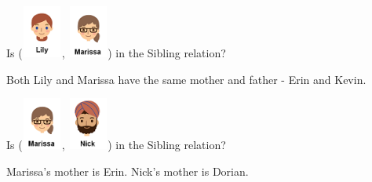 \documentclass{ximera}
\begin{document}
\begin{exercise}
Is ({\includegraphics[width=50px,height=65px]{pics/people/lily.png}}, {\includegraphics[width=50px,height=65px]{pics/people/marissa.png}}) in the Sibling relation?

  \begin{multipleChoice}
  \end{multipleChoice}
  \begin{feedback}
Both Lily and Marissa have the same mother and father - Erin and Kevin.
  \end{feedback}
\end{exercise}






\begin{exercise}
Is ({\includegraphics[width=50px,height=65px]{pics/people/marissa.png}}, {\includegraphics[width=50px,height=65px]{pics/people/nick.png}}) in the Sibling relation?

  \begin{multipleChoice}
  \end{multipleChoice}
  \begin{feedback}
Marissa's mother is Erin. Nick's mother is Dorian.
  \end{feedback}
\end{exercise}
\end{document}
